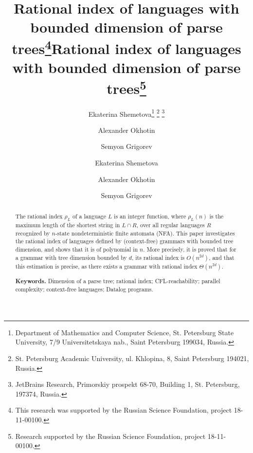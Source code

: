 \documentclass[runningheads]{llncs}
\begin{document}
\sloppy

\title{Rational index of languages with bounded dimension of parse trees\footnote{%
This research was supported by the Russian Science Foundation, project 18-11-00100.}}

\author{Ekaterina Shemetova\footnote{%
Department of Mathematics and Computer Science, St. Petersburg State University, 
7/9 Universitetskaya nab., Saint Petersburg 199034, Russia.}
\footnote{%
St. Petersburg Academic University, 
ul. Khlopina, 8, Saint Petersburg 194021, Russia.}
\footnote{%
JetBrains Research,
Primorskiy prospekt 68-70, Building 1, St. Petersburg, 197374, Russia.}
\and
Alexander Okhotin\footnotemark[2]
\and
Semyon Grigorev\footnotemark[2] \footnotemark[4]
}

\title{Rational index of languages with bounded dimension of parse trees\thanks{%
	Research supported by the Russian Science Foundation, project 18-11-00100.}
}

\author{Ekaterina Shemetova
\and
Alexander Okhotin
\and
Semyon Grigorev
}



\maketitle


\begin{abstract}
The rational index $\rho_L$ of a language $L$ is an integer function,
where $\rho_L(n)$ is the maximum length of the shortest string in $L \cap R$,
over all regular languages $R$ recognized by $n$-state nondeterministic finite automata (NFA).
This paper investigates the rational index of languages
defined by (context-free) grammars with bounded tree dimension,
and shows that it is of polynomial in $n$.
More precisely, it is proved that for a grammar with tree dimension bounded by $d$,
its rational index is $O(n^{2d})$,
and that this estimation is precise,
as there exists a grammar with rational index $\Theta(n^{2d})$.

\textbf{Keywords.}
Dimension of a parse tree; rational index; CFL-reachability; parallel complexity; context-free languages; Datalog programs.
\end{abstract}
\end{document}
